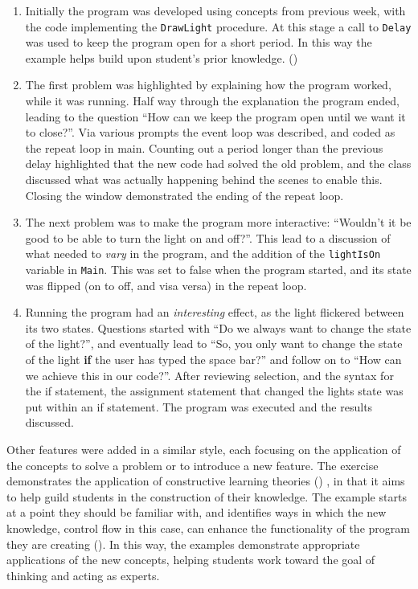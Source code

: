 \begin{enumerate}
  \item Initially the program was developed using concepts from previous week, with the code implementing the \texttt{DrawLight} procedure. At this stage a call to \texttt{Delay} was used to keep the program open for a short period. In this way the example helps build upon student's prior knowledge. ()
  \item The first problem was highlighted by explaining how the program worked, while it was running. Half way through the explanation the program ended, leading to the question ``How can we keep the program open until we want it to close?''. Via various prompts the event loop was described, and coded as the repeat loop in main. Counting out a period longer than the previous delay highlighted that the new code had solved the old problem, and the class discussed what was actually happening behind the scenes to enable this. Closing the window demonstrated the ending of the repeat loop.
  \item The next problem was to make the program more interactive: ``Wouldn't it be good to be able to turn the light on and off?''. This lead to a discussion of what needed to \emph{vary} in the program, and the addition of the \texttt{lightIsOn} variable in \texttt{Main}. This was set to false when the program started, and its state was flipped (on to off, and visa versa) in the repeat loop.
  \item Running the program had an \emph{interesting} effect, as the light flickered between its two states. Questions started with ``Do we always want to change the state of the light?'', and eventually lead to ``So, you only want to change the state of the light \textbf{if} the user has typed the space bar?'' and follow on to ``How can we achieve this in our code?''. After reviewing selection, and the syntax for the if statement, the assignment statement that changed the lights state was put within an if statement. The program was executed and the results discussed.
\end{enumerate}

Other features were added in a similar style, each focusing on the application of the concepts to solve a problem or to introduce a new feature.  The exercise demonstrates the application of constructive learning theories () , in that it aims to help guild students in the construction of their knowledge. The example starts at a point they should be familiar with, and identifies ways in which the new knowledge, control flow in this case, can enhance the functionality of the program they are creating (). In this way, the examples demonstrate appropriate applications of the new concepts, helping students work toward the goal of thinking and acting as experts.

